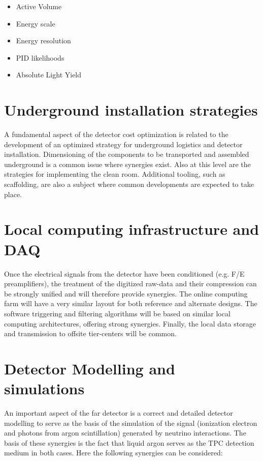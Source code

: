 \begin{itemize}

\item Active	
  Volume	
  
\item Energy	
  scale	

\item Energy	
  resolution	
  	
\item PID	
  likelihoods	
  
\item Absolute	
  Light	
  Yield	
  	
\end{itemize}


\section{Underground installation strategies}
A fundamental aspect of the detector cost optimization is related to the development of an optimized strategy for underground logistics and detector installation. Dimensioning of the components to be transported and assembled underground is a common issue where synergies exist. Also at this level are the strategies for implementing the clean room. Additional tooling, such as scaffolding, are also a subject where common developments are expected to take place.

\section{Local computing infrastructure and DAQ}
Once the electrical signals from the detector have been conditioned (e.g. F/E preamplifiers), the treatment of the digitized raw-data and their compression can be strongly unified and will therefore provide synergies. The online computing farm will have a very similar layout for both reference and alternate designs. The software triggering and filtering algorithms will be based on similar local computing architectures, offering strong synergies. Finally, the local data storage and transmission to offsite tier-centers will be common.

\section{Detector Modelling and simulations}

An important aspect  of the far detector is a correct and detailed detector modelling to serve as the basis of the simulation of the signal (ionization electron and photons from argon scintillation) generated by neutrino interactions. The basis of these synergies is the fact that liquid argon serves as the TPC detection medium in both cases. Here the following synergies can be considered: 


